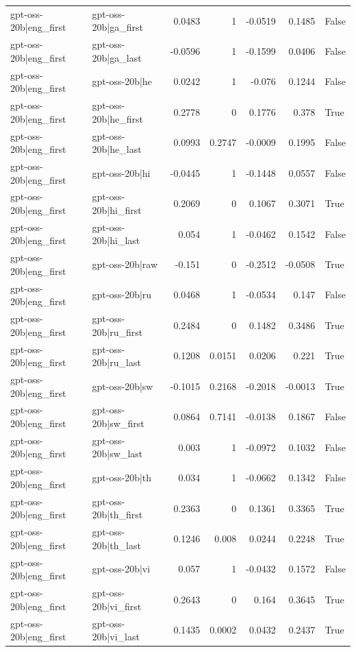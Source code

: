 \begin{table}
\begin{tabular}{l l r r r r l}
gpt-oss-20b|eng_first & gpt-oss-20b|ga_first & 0.0483 & 1 & -0.0519 & 0.1485 & False \\
gpt-oss-20b|eng_first & gpt-oss-20b|ga_last & -0.0596 & 1 & -0.1599 & 0.0406 & False \\
gpt-oss-20b|eng_first & gpt-oss-20b|he & 0.0242 & 1 & -0.076 & 0.1244 & False \\
gpt-oss-20b|eng_first & gpt-oss-20b|he_first & 0.2778 & 0 & 0.1776 & 0.378 & True \\
gpt-oss-20b|eng_first & gpt-oss-20b|he_last & 0.0993 & 0.2747 & -0.0009 & 0.1995 & False \\
gpt-oss-20b|eng_first & gpt-oss-20b|hi & -0.0445 & 1 & -0.1448 & 0.0557 & False \\
gpt-oss-20b|eng_first & gpt-oss-20b|hi_first & 0.2069 & 0 & 0.1067 & 0.3071 & True \\
gpt-oss-20b|eng_first & gpt-oss-20b|hi_last & 0.054 & 1 & -0.0462 & 0.1542 & False \\
gpt-oss-20b|eng_first & gpt-oss-20b|raw & -0.151 & 0 & -0.2512 & -0.0508 & True \\
gpt-oss-20b|eng_first & gpt-oss-20b|ru & 0.0468 & 1 & -0.0534 & 0.147 & False \\
gpt-oss-20b|eng_first & gpt-oss-20b|ru_first & 0.2484 & 0 & 0.1482 & 0.3486 & True \\
gpt-oss-20b|eng_first & gpt-oss-20b|ru_last & 0.1208 & 0.0151 & 0.0206 & 0.221 & True \\
gpt-oss-20b|eng_first & gpt-oss-20b|sw & -0.1015 & 0.2168 & -0.2018 & -0.0013 & True \\
gpt-oss-20b|eng_first & gpt-oss-20b|sw_first & 0.0864 & 0.7141 & -0.0138 & 0.1867 & False \\
gpt-oss-20b|eng_first & gpt-oss-20b|sw_last & 0.003 & 1 & -0.0972 & 0.1032 & False \\
gpt-oss-20b|eng_first & gpt-oss-20b|th & 0.034 & 1 & -0.0662 & 0.1342 & False \\
gpt-oss-20b|eng_first & gpt-oss-20b|th_first & 0.2363 & 0 & 0.1361 & 0.3365 & True \\
gpt-oss-20b|eng_first & gpt-oss-20b|th_last & 0.1246 & 0.008 & 0.0244 & 0.2248 & True \\
gpt-oss-20b|eng_first & gpt-oss-20b|vi & 0.057 & 1 & -0.0432 & 0.1572 & False \\
gpt-oss-20b|eng_first & gpt-oss-20b|vi_first & 0.2643 & 0 & 0.164 & 0.3645 & True \\
gpt-oss-20b|eng_first & gpt-oss-20b|vi_last & 0.1435 & 0.0002 & 0.0432 & 0.2437 & True \\

\end{tabular}
\end{table}
